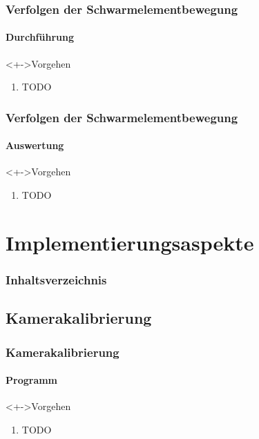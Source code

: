 \documentclass{beamer}
\begin{document}

\begin{frame}
	\frametitle{Verfolgen der Schwarmelementbewegung}\framesubtitle{Durchf\"uhrung}
	\begin{block}<+->{Vorgehen}
		\begin{enumerate}
		  \item TODO
		\end{enumerate}
	\end{block}
\end{frame}


\begin{frame}
	\frametitle{Verfolgen der Schwarmelementbewegung}\framesubtitle{Auswertung}
	\begin{block}<+->{Vorgehen}
		\begin{enumerate}
		  \item TODO
		\end{enumerate}
	\end{block}
\end{frame}


\section[Implementation]{Implementierungsaspekte}


\begin{frame}\frametitle{Inhaltsverzeichnis}
\end{frame}


\subsection[Kalibrierung]{Kamerakalibrierung}


\begin{frame}
	\frametitle{Kamerakalibrierung}\framesubtitle{Programm}
	\begin{block}<+->{Vorgehen}
		\begin{enumerate}
		  \item TODO
		\end{enumerate}
	\end{block}
\end{frame}
\end{document}
